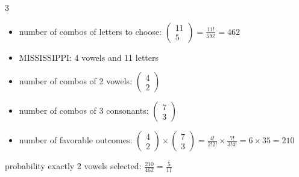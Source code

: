 \documentclass[12 pt]{article}
\begin{document}
    \begin{exercise}{3}
    \hfill

    \begin{itemize}
        \item number of combos of letters to choose: $\begin{pmatrix}
            11 \\
            5
        \end{pmatrix} = \frac{11!}{5!6!} = 462$
        \item MISSISSIPPI: 4 vowels and 11 letters
         
        \item number of combos of 2 vowels: $\begin{pmatrix}
            4 \\
            2
        \end{pmatrix}$

        \item number of combos of 3 consonants: $\begin{pmatrix}
            7 \\
            3
        \end{pmatrix}$

        \item number of favorable outcomes: $\begin{pmatrix}
            4 \\ 
            2
        \end{pmatrix} \times \begin{pmatrix}
            7 \\
            3
        \end{pmatrix} = \frac{4!}{2!2!} \times \frac{7!}{3!4!} = 6 \times 35 = 210$
    \end{itemize}   
         probability exactly 2 vowels selected: $\frac{210}{462} = \frac{5}{11}$
    \end{exercise}
\end{document}
